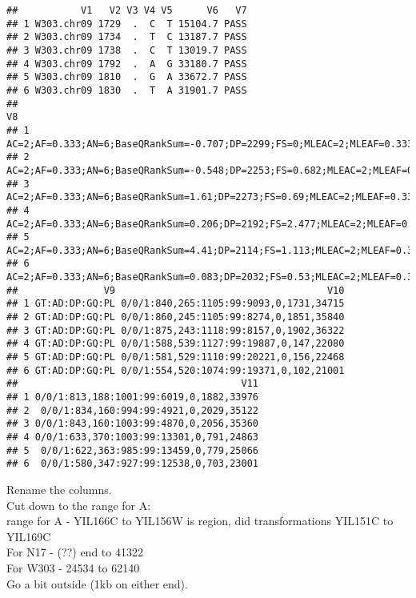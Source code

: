 \documentclass[
]{article}
\begin{document}
\begin{verbatim}
##           V1   V2 V3 V4 V5      V6   V7
## 1 W303.chr09 1729  .  C  T 15104.7 PASS
## 2 W303.chr09 1734  .  T  C 13187.7 PASS
## 3 W303.chr09 1738  .  C  T 13019.7 PASS
## 4 W303.chr09 1792  .  A  G 33180.7 PASS
## 5 W303.chr09 1810  .  G  A 33672.7 PASS
## 6 W303.chr09 1830  .  T  A 31901.7 PASS
##                                                                                                                                              V8
## 1      AC=2;AF=0.333;AN=6;BaseQRankSum=-0.707;DP=2299;FS=0;MLEAC=2;MLEAF=0.333;MQ=58.76;MQRankSum=-6.455;QD=7.17;ReadPosRankSum=0.458;SOR=0.663
## 2   AC=2;AF=0.333;AN=6;BaseQRankSum=-0.548;DP=2253;FS=0.682;MLEAC=2;MLEAF=0.333;MQ=58.78;MQRankSum=-0.557;QD=6.28;ReadPosRankSum=2.21;SOR=0.613
## 3       AC=2;AF=0.333;AN=6;BaseQRankSum=1.61;DP=2273;FS=0.69;MLEAC=2;MLEAF=0.333;MQ=58.77;MQRankSum=-0.442;QD=6.14;ReadPosRankSum=2.8;SOR=0.571
## 4 AC=2;AF=0.333;AN=6;BaseQRankSum=0.206;DP=2192;FS=2.477;MLEAC=2;MLEAF=0.333;MQ=59.52;MQRankSum=-5.104;QD=15.58;ReadPosRankSum=-0.879;SOR=0.712
## 5  AC=2;AF=0.333;AN=6;BaseQRankSum=4.41;DP=2114;FS=1.113;MLEAC=2;MLEAF=0.333;MQ=59.59;MQRankSum=-5.116;QD=16.07;ReadPosRankSum=-0.255;SOR=0.791
## 6   AC=2;AF=0.333;AN=6;BaseQRankSum=0.083;DP=2032;FS=0.53;MLEAC=2;MLEAF=0.333;MQ=59.52;MQRankSum=-5.461;QD=15.94;ReadPosRankSum=0.019;SOR=0.735
##               V9                                     V10
## 1 GT:AD:DP:GQ:PL 0/0/1:840,265:1105:99:9093,0,1731,34715
## 2 GT:AD:DP:GQ:PL 0/0/1:860,245:1105:99:8274,0,1851,35840
## 3 GT:AD:DP:GQ:PL 0/0/1:875,243:1118:99:8157,0,1902,36322
## 4 GT:AD:DP:GQ:PL 0/0/1:588,539:1127:99:19887,0,147,22080
## 5 GT:AD:DP:GQ:PL 0/0/1:581,529:1110:99:20221,0,156,22468
## 6 GT:AD:DP:GQ:PL 0/0/1:554,520:1074:99:19371,0,102,21001
##                                       V11
## 1 0/0/1:813,188:1001:99:6019,0,1882,33976
## 2  0/0/1:834,160:994:99:4921,0,2029,35122
## 3 0/0/1:843,160:1003:99:4870,0,2056,35360
## 4 0/0/1:633,370:1003:99:13301,0,791,24863
## 5  0/0/1:622,363:985:99:13459,0,779,25066
## 6  0/0/1:580,347:927:99:12538,0,703,23001
\end{verbatim}

Rename the columns.\\
Cut down to the range for A:\\
range for A - YIL166C to YIL156W is region, did transformations YIL151C
to YIL169C\\
For N17 - (??) end to 41322\\
For W303 - 24534 to 62140\\
Go a bit outside (1kb on either end).
\end{document}
